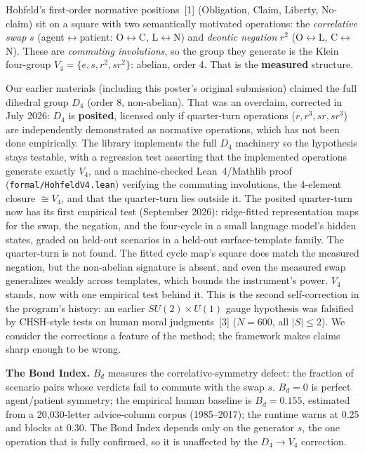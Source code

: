 \documentclass[10pt,twocolumn]{article}
\begin{document}
Hohfeld's first-order normative positions~[1] (Obligation, Claim, Liberty, No-claim)
sit on a square with two semantically motivated operations: the
\emph{correlative swap} $s$ (agent$\leftrightarrow$patient: O$\leftrightarrow$C,
L$\leftrightarrow$N) and \emph{deontic negation} $r^2$ (O$\leftrightarrow$L,
C$\leftrightarrow$N). These are \emph{commuting involutions}, so the group they
generate is the Klein four-group $V_4=\{e,s,r^2,sr^2\}$: abelian, order 4. That
is the \textbf{measured} structure.

Our earlier materials (including this poster's original submission) claimed the
full dihedral group $D_4$ (order 8, non-abelian). That was an overclaim,
corrected in July 2026: $D_4$ is \textbf{posited}, licensed only if
quarter-turn operations ($r, r^3, sr, sr^3$) are independently demonstrated as
normative operations, which has not been done empirically. The library implements
the full $D_4$ machinery so the hypothesis stays testable, with a regression test
asserting that the implemented operations generate exactly $V_4$, and a
machine-checked Lean~4/Mathlib proof (\texttt{formal/HohfeldV4.lean}) verifying the
commuting involutions, the 4-element closure $\cong V_4$, and that the quarter-turn
lies outside it. The posited quarter-turn now has its first empirical test
(September 2026): ridge-fitted representation maps for the swap, the negation,
and the four-cycle in a small language model's hidden states, graded on held-out
scenarios in a held-out surface-template family. The quarter-turn is not found.
The fitted cycle map's square does match the measured negation, but the
non-abelian signature is absent, and even the measured swap generalizes weakly
across templates, which bounds the instrument's power. $V_4$ stands, now with
one empirical test behind it. This is the second
self-correction in the program's history: an earlier $SU(2)\times U(1)$ gauge
hypothesis was falsified by CHSH-style tests on human moral judgments~[3] ($N{=}600$,
all $|S|\le 2$). We consider the corrections a feature of the method; the
framework makes claims sharp enough to be wrong.

\textbf{The Bond Index.} $B_d$ measures the correlative-symmetry defect: the
fraction of scenario pairs whose verdicts fail to commute with the swap $s$.
$B_d=0$ is perfect agent/patient symmetry; the empirical human baseline is
$B_d=0.155$, estimated from a 20{,}030-letter advice-column corpus (1985--2017);
the runtime warns at 0.25 and blocks at 0.30. The Bond Index depends only on the
generator $s$, the one operation that is fully confirmed, so it is unaffected
by the $D_4\to V_4$ correction.
\end{document}
